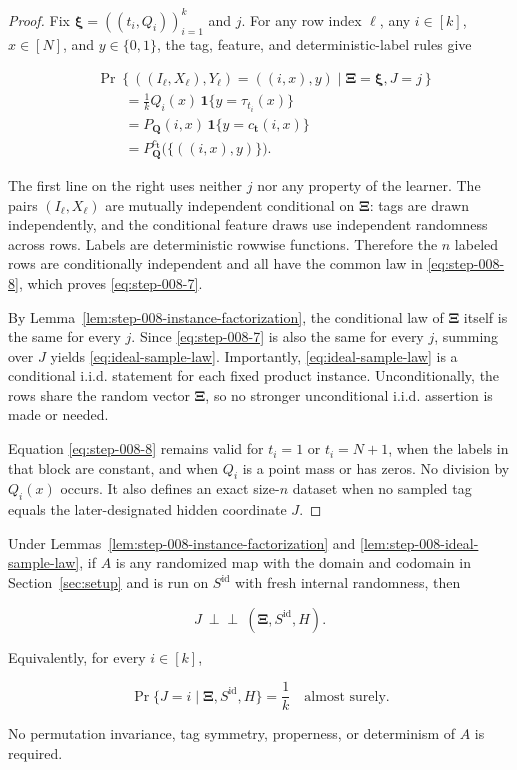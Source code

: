 \begin{proof}
Fix \(\boldsymbol\xi=((t_i,Q_i))_{i=1}^k\) and \(j\). For any row index
\(\ell\), any \(i\in[k]\), \(x\in[N]\), and \(y\in\{0,1\}\), the tag,
feature, and deterministic-label rules give

\[
\begin{aligned}
&\Pr\left\{((I_\ell,X_\ell),Y_\ell)=((i,x),y)
  \mid\boldsymbol\Xi=\boldsymbol\xi,J=j\right\}\\
&\qquad=\frac1k Q_i(x)\,
  \mathbf1\{y=\tau_{t_i}(x)\}\\
&\qquad=P_{\boldsymbol Q}(i,x)\,
  \mathbf1\{y=c_{\boldsymbol t}(i,x)\}\\
&\qquad=P_{\boldsymbol Q}^{c_{\boldsymbol t}}
  \bigl(\{((i,x),y)\}\bigr).
\end{aligned}
\tag{S8.8}\label{eq:step-008-8}
\]

The first line on the right uses neither \(j\) nor any property of the
learner. The pairs \((I_\ell,X_\ell)\) are mutually independent conditional
on \(\boldsymbol\Xi\): tags are drawn independently, and the conditional
feature draws use independent randomness across rows. Labels are
deterministic rowwise functions. Therefore the \(n\) labeled rows are
conditionally independent and all have the common law in \eqref{eq:step-008-8}, which proves
\eqref{eq:step-008-7}.

By Lemma~\ref{lem:step-008-instance-factorization}, the conditional law of
\(\boldsymbol\Xi\) itself is the same for every \(j\). Since \eqref{eq:step-008-7} is also the
same for every \(j\), summing over \(J\) yields \eqref{eq:ideal-sample-law}. Importantly, \eqref{eq:ideal-sample-law} is a
conditional i.i.d. statement for each fixed product instance. Unconditionally,
the rows share the random vector \(\boldsymbol\Xi\), so no stronger
unconditional i.i.d. assertion is made or needed.

Equation \eqref{eq:step-008-8} remains valid for \(t_i=1\) or \(t_i=N+1\), when the labels in
that block are constant, and when \(Q_i\) is a point mass or has zeros. No
division by \(Q_i(x)\) occurs. It also defines an exact size-\(n\) dataset
when no sampled tag equals the later-designated hidden coordinate \(J\).
\end{proof}

\begin{lemma}\label{lem:step-008-selector-independence}
Under Lemmas~\ref{lem:step-008-instance-factorization} and
\ref{lem:step-008-ideal-sample-law}, if \(A\) is any randomized map with the
domain and codomain in Section~\ref{sec:setup} and is run on
\(S^{\mathrm{id}}\) with fresh internal randomness, then

\[
J\ \perp\!\!\!\perp\
(\boldsymbol\Xi,S^{\mathrm{id}},H).
\tag{S8.9}\label{eq:step-008-9}
\]

Equivalently, for every \(i\in[k]\),

\[
\Pr\{J=i\mid\boldsymbol\Xi,S^{\mathrm{id}},H\}=\frac1k
\quad\text{almost surely}.
\tag{S8.10}\label{eq:step-008-10}
\]

No permutation invariance, tag symmetry, properness, or determinism of
\(A\) is required.
\end{lemma}

